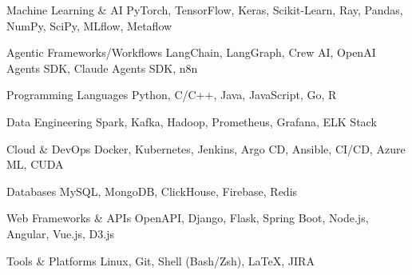 

\begin{cvskills}

  \cvskill
    {Machine Learning \& AI} %
    {PyTorch, TensorFlow, Keras, Scikit-Learn, Ray, Pandas, NumPy, SciPy, MLflow, Metaflow} %

  \cvskill
    {Agentic Frameworks/Workflows} %
    {LangChain, LangGraph, Crew AI, OpenAI Agents SDK, Claude Agents SDK, n8n} %

  \cvskill
    {Programming Languages} %
    {Python, C/C++, Java, JavaScript, Go, R} %

  \cvskill
    {Data Engineering} %
    {Spark, Kafka, Hadoop, Prometheus, Grafana, ELK Stack} %

  \cvskill
    {Cloud \& DevOps} %
    {Docker, Kubernetes, Jenkins, Argo CD, Ansible, CI/CD, Azure ML, CUDA} %

  \cvskill
    {Databases} %
    {MySQL, MongoDB, ClickHouse, Firebase, Redis} %

  \cvskill
    {Web Frameworks \& APIs} %
    {OpenAPI, Django, Flask, Spring Boot, Node.js, Angular, Vue.js, D3.js} %

  \cvskill
    {Tools \& Platforms} %
    {Linux, Git, Shell (Bash/Zsh), \LaTeX, JIRA} %

\end{cvskills}
